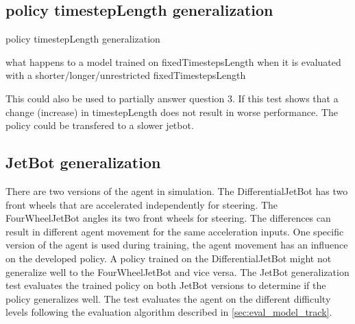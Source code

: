 





\subsection{policy timestepLength generalization}

policy timestepLength generalization 

what happens to a model trained on fixedTimestepsLength when it is evaluated with a shorter/longer/unrestricted fixedTimestepsLength

This could also be used to partially answer question 3. 
If this test shows that a change (increase) in timestepLength does not result in worse performance. The policy could be transfered to a slower jetbot.


\subsection{JetBot generalization}

There are two versions of the agent in simulation. The DifferentialJetBot has two front wheels that are accelerated independently for steering. The FourWheelJetBot angles its two front wheels for steering. The differences can result in different agent movement for the same acceleration inputs. One specific version of the agent is used during training, the agent movement has an influence on the developed policy.
A policy trained on the DifferentialJetBot might not generalize well to the FourWheelJetBot and vice versa. The JetBot generalization test evaluates the trained policy on both JetBot versions to determine if the policy generalizes well. The test evaluates the agent on the different difficulty levels following the evaluation algorithm described in \ref{sec:eval_model_track}.



